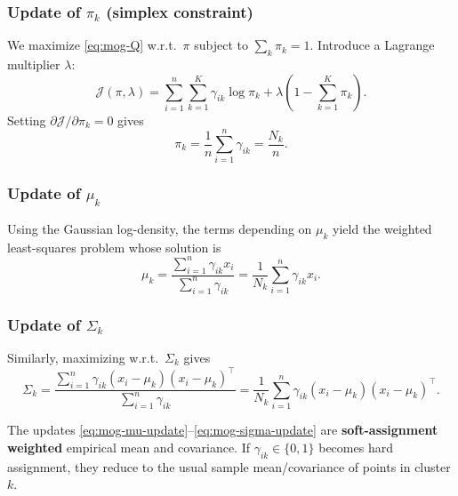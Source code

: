 \documentclass[../main]{subfiles}
\begin{document}
\subsubsection{Update of $\pi_k$ (simplex constraint)}
We maximize \eqref{eq:mog-Q} w.r.t.\ $\pi$ subject to $\sum_k \pi_k=1$.
Introduce a Lagrange multiplier $\lambda$:
\begin{equation}
    \mathcal J(\pi,\lambda)
    =
    \sum_{i=1}^n \sum_{k=1}^K \gamma_{ik}\log \pi_k
    + \lambda\left(1-\sum_{k=1}^K \pi_k\right).
\end{equation}
Setting $\partial \mathcal J/\partial \pi_k=0$ gives
\begin{equation}
    \pi_k
    =
    \frac{1}{n}\sum_{i=1}^n \gamma_{ik}
    =
    \frac{N_k}{n}.
\end{equation}

\subsubsection{Update of $\mu_k$}
Using the Gaussian log-density, the terms depending on $\mu_k$ yield the
weighted least-squares problem whose solution is
\begin{equation}\label{eq:mog-mu-update}
    \mu_k
    =
    \frac{\sum_{i=1}^n \gamma_{ik} x_i}{\sum_{i=1}^n \gamma_{ik}}
    =
    \frac{1}{N_k}\sum_{i=1}^n \gamma_{ik} x_i.
\end{equation}

\subsubsection{Update of $\Sigma_k$}
Similarly, maximizing w.r.t.\ $\Sigma_k$ gives
\begin{equation}\label{eq:mog-sigma-update}
    \Sigma_k
    =
    \frac{\sum_{i=1}^n \gamma_{ik} (x_i-\mu_k)(x_i-\mu_k)^\top}{\sum_{i=1}^n \gamma_{ik}}
    =
    \frac{1}{N_k}\sum_{i=1}^n \gamma_{ik} (x_i-\mu_k)(x_i-\mu_k)^\top.
\end{equation}

\begin{remark}
    The updates \eqref{eq:mog-mu-update}--\eqref{eq:mog-sigma-update} are
    \textbf{soft-assignment weighted} empirical mean and covariance.  If
    $\gamma_{ik}\in\{0,1\}$ becomes hard assignment, they reduce to the usual
    sample mean/covariance of points in cluster $k$.
\end{remark}
\end{document}
